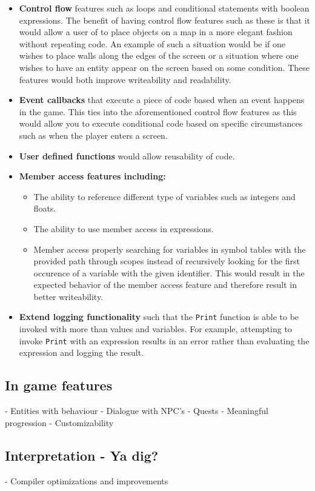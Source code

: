 \begin{itemize}
    \item
      \textbf{Control flow} features such as loops and conditional statements with boolean expressions. The benefit of having control flow features such as these is that it would allow a user of \dazel{} to place objects on a map in a more elegant fashion without repeating code. An example of such a situation would be if one wishes to place walls along the edges of the screen or a situation where one wishes to have an entity appear on the screen based on some condition. These features would both improve writeability and readability.
    \item
      \textbf{Event callbacks} that execute a piece of code based when an event happens in the game. This ties into the aforementioned control flow features as this would allow you to execute conditional code based on specific circumstances such as when the player enters a screen. 
    \item
      \textbf{User defined functions} would allow reusability of code. 
    \item
      \textbf{Member access features including:}
      \begin{itemize}
        \item
            The ability to reference different type of variables such as integers and floats.
        \item
            The ability to use member access in expressions.    
        \item
            Member access properly searching for variables in symbol tables with the provided path through scopes instead of recursively looking for the first occurence of a variable with the given identifier. This would result in the expected behavior of the member access feature and therefore result in better writeability.
      \end{itemize}
    \item
      \textbf{Extend logging functionality} such that the \texttt{Print} function is able to be invoked with more than values and variables. For example, attempting to invoke \texttt{Print} with an expression results in an error rather than evaluating the expression and logging the result.
\end{itemize}


\subsection*{In game features}
- Entities with behaviour
- Dialogue with NPC's
- Quests
- Meaningful progression
- Customizability

\subsection*{Interpretation - Ya dig?}






- Compiler optimizations and improvements
